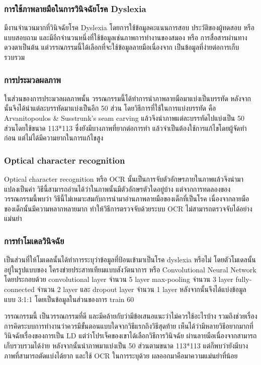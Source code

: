\documentclass[12pt,oneside,openright,a4paper]{cpe-thai-project}
\begin{document}
\subsubsection{การใช้ภาพลายมือในการวินิจฉัยโรค Dyslexia}
มีงานจำนวนมากที่วินิจฉัยโรค Dyslexia โดยการใช้ข้อมูลคะแนนการสอบ ประวัติของผู้ทดสอบ หรือ แบบสอบถาม และมีอีกจำนวนหนึ่งที่ใช้ข้อมูลเช่นภาพการทำงานของสมอง หรือ การสื่อสารผ่านทางดวงตาเป็นต้น 
แต่วรรณกรรมนี้ได้เลือกที่จะใช้ข้อมูลลายมือเนื่องจาก เป็นข้อมูลที่ง่ายต่อการเก็บรวบรวม


\subsubsection{การประมวลผลภาพ}
ในส่วนของการประมวลผลภาพนั้น วรรณกรรมนี้ได้ทำการนำภาพลายมือมาแบ่งเป็นบรรทัด 
หลังจากนั้นจึงได้นำแต่ละบรรทัดมาแบ่งเป็นอีก 50 ส่วน โดยวิธีการที่ใช้ในการแบ่งบรรทัด คือ 
 Arvanitopoulos & Susstrunk’s seam carving แล้วจึงนำภาพแต่ละบรรทัดไปแบ่งเป็น 50 
 ส่วนโดยใช้ขนาด 113*113 ซึ่งยังมีบางภาพที่ยากต่อการทำ แล้วจำเป็นต้องใช้การแก้ไขโดยผู้จัดทำก่อน แต่ไม่ได้มีความยากในการแก้ไขสูง

 \subsubsection{Optical character recognition}
 Optical character recognition หรือ OCR นั้นเป็นการจับตัวอักษรภายในภาพแล้วจึงนำมาแปลงเป็นค่า
  วิธีนี้สามารถอ่านได้ว่าในภาพนั้นมีตัวอักษรตัวใดอยู่บ้าง แต่จากการทดลองของวรรณกรรมนี้พบว่า 
  วิธีนี้ไม่เหมาะสมกับการนำมาอ่านภาพลายมือของเด็กที่เป็นโรค 
  เนื่องจากลายมือของเด็กนั้นมีความหลากหลายมาก ทำให้วิธีการตรวจจับด้วยระบบ OCR ไม่สามารถตรวจจับได้อย่างแม่นยำ
\subsubsection{การทำโมเดลวินิจฉัย}
เป็นส่วนที่ให้โมเดลนั้นได้ทำการระบุว่าข้อมูลที่ป้อนเข้ามาเป็นโรค dyslexia หรือไม่ 
โดยตัวโมเดลนั้นอยู่ในรูปแบบของ  โครงข่ายประสาทเทียมแบบสังวัตนาการ 
หรือ Convolutional Neural Network โดยประกอบด้วย convolutional layer จำนวน 5 layer 
max-pooling จำนวน 3 layer fully-connected จำนวน 2 layer และ dropout layer จำนวน 1 layer 
หลังจากนั้นจึงได้แบ่งข้อมูลแบบ 3:1:1 โดยเป็นข้อมูลในส่วนของการ train 60%

วรรณกรรมนี้ เป็นวรรณกรรมที่ดี และมีคล้ายกับว่ามีข้อเสนอแนะว่าไม่ควรใช้อะไรบ้าง 
รวมถึงช่วยเรื่องการคิดระบบการทำงานว่าควรมีขั้นตอนแบบใดจากวิธีแรกถึงวิธีสุดท้าย
 เห็นได้ว่ามีหลายวิธีอยากมากที่วินิจฉัยเรื่องของการเป็น LD แต่ว่าโปรเจ็คของเขาได้เลือกวิธีการวินิจฉัย
 ผ่านลายมือเนื่องจากสามารถเก็บรวบรวมได้ง่าย หลังจากนั้นนำภาพมาแบ่งเป็น 50 ส่วนตามขนาด 113*113 
 แต่ก็พบว่ายังมีบางภาพที่สามารถตัดแบ่งได้ยาก และใช้ OCR ในการระบุด้วย ผลออกมาคือมาความแม่นยำที่น้อย
\end{document}
